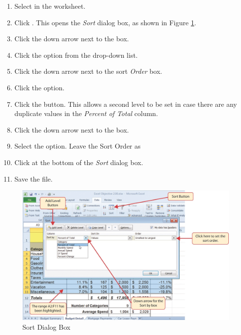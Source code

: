 \begin{enumbox}
	\begin{enumerate}
		\item Select  in the  worksheet.
		\item Click . This opens the \textit{Sort} dialog box, as shown in Figure \ref{02:fig27}.
		\item Click the down arrow next to the  box.
		\item Click the  option from the drop-down list.
		\item Click the down arrow next to the sort \textit{Order} box.
		\item Click the  option.
		\item Click the  button. This allows a second level to be set in case there are any duplicate values in the \textit{Percent of Total} column.
		\item Click the down arrow next to the  box.
		\item Select the  option. Leave the Sort Order as 
		\item Click  at the bottom of the \textit{Sort} dialog box.
		\item Save the  file.
	\end{enumerate}
\end{enumbox}

\begin{figure}[H]
	\centering
	\includegraphics[width=\maxwidth{.95\linewidth}]{gfx/ch02_fig27}
	\caption{Sort Dialog Box}
	\label{02:fig27}
\end{figure}

